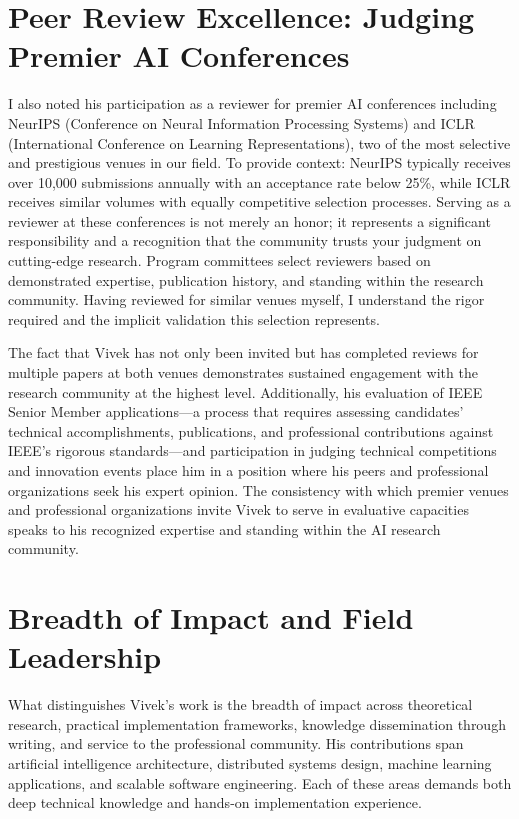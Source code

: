 \documentclass[11pt]{article}
\begin{document}
\section*{Peer Review Excellence: Judging Premier AI Conferences}

I also noted his participation as a reviewer for premier AI conferences including NeurIPS (Conference on Neural Information Processing Systems) and ICLR (International Conference on Learning Representations), two of the most selective and prestigious venues in our field. To provide context: NeurIPS typically receives over 10,000 submissions annually with an acceptance rate below 25\%, while ICLR receives similar volumes with equally competitive selection processes. Serving as a reviewer at these conferences is not merely an honor; it represents a significant responsibility and a recognition that the community trusts your judgment on cutting-edge research. Program committees select reviewers based on demonstrated expertise, publication history, and standing within the research community. Having reviewed for similar venues myself, I understand the rigor required and the implicit validation this selection represents.

The fact that Vivek has not only been invited but has completed reviews for multiple papers at both venues demonstrates sustained engagement with the research community at the highest level. Additionally, his evaluation of IEEE Senior Member applications---a process that requires assessing candidates' technical accomplishments, publications, and professional contributions against IEEE's rigorous standards---and participation in judging technical competitions and innovation events place him in a position where his peers and professional organizations seek his expert opinion. The consistency with which premier venues and professional organizations invite Vivek to serve in evaluative capacities speaks to his recognized expertise and standing within the AI research community.



\section*{Breadth of Impact and Field Leadership}

What distinguishes Vivek's work is the breadth of impact across theoretical research, practical implementation frameworks, knowledge dissemination through writing, and service to the professional community. His contributions span artificial intelligence architecture, distributed systems design, machine learning applications, and scalable software engineering. Each of these areas demands both deep technical knowledge and hands-on implementation experience.
\end{document}
